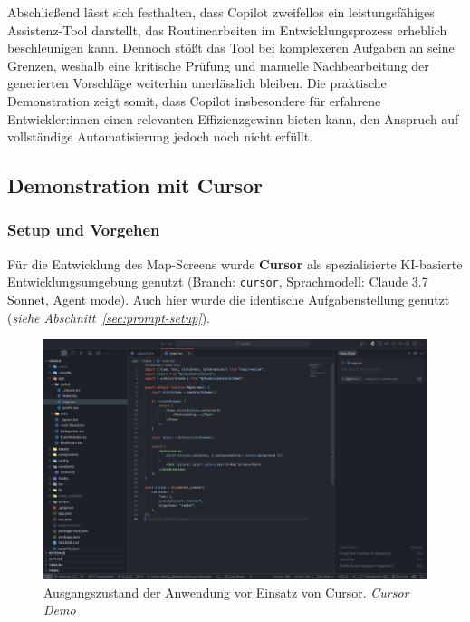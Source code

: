 Abschließend lässt sich festhalten, dass Copilot zweifellos ein
leistungsfähiges Assistenz-Tool darstellt, das Routinearbeiten im
Entwicklungsprozess erheblich beschleunigen kann. Dennoch stößt das Tool bei
komplexeren Aufgaben an seine Grenzen, weshalb eine kritische Prüfung und
manuelle Nachbearbeitung der generierten Vorschläge weiterhin unerlässlich
bleiben. Die praktische Demonstration zeigt somit, dass Copilot insbesondere
für erfahrene Entwickler:innen einen relevanten Effizienzgewinn bieten kann,
den Anspruch auf vollständige Automatisierung jedoch noch nicht erfüllt.

\subsection{Demonstration mit Cursor}

\subsubsection{Setup und Vorgehen}
Für die Entwicklung des Map-Screens wurde \textbf{Cursor} als spezialisierte
KI-basierte Entwicklungsumgebung genutzt (Branch: \texttt{cursor},
Sprachmodell: Claude 3.7 Sonnet, Agent mode). Auch hier wurde die identische
Aufgabenstellung genutzt (\emph{siehe Abschnitt~\ref{sec:prompt-setup}}).

\begin{figure}[htbp]
      \centering
      \vspace{1em}
      \includegraphics[width=1\textwidth]{images/cursor_screenshots/Screenshots Ist-Zustand-cursor.png}
      \caption{Ausgangszustand der Anwendung vor Einsatz von Cursor. \textit{Cursor Demo}}
      \label{fig:cursor-istzustand}
\end{figure}

